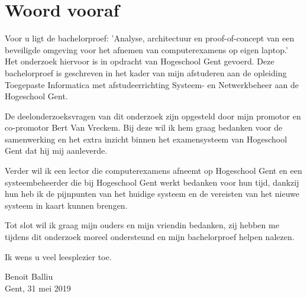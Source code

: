 
\chapter*{Woord vooraf}
\label{ch:voorwoord}


Voor u ligt de bachelorproef: 'Analyse, architectuur en proof-of-concept van een beveiligde omgeving voor het afnemen van computerexamens op eigen laptop.' Het onderzoek hiervoor is in opdracht van Hogeschool Gent gevoerd. Deze bachelorproef is geschreven in het kader van mijn afstuderen aan de opleiding Toegepaste Informatica met afstudeerrichting Systeem- en Netwerkbeheer aan de Hogeschool Gent.

De deelonderzoeksvragen van dit onderzoek zijn opgesteld door mijn promotor en co-promotor Bert Van Vreckem. Bij deze wil ik hem graag bedanken voor de samenwerking en het extra inzicht binnen het examensysteem van Hogeschool Gent dat hij mij aanleverde. 

Verder wil ik een lector die computerexamens afneemt op Hogeschool Gent en een systeembeheerder die bij Hogeschool Gent werkt bedanken voor hun tijd, dankzij hun heb ik de pijnpunten van het huidige systeem en de vereisten van het nieuwe systeem in kaart kunnen brengen.

Tot slot wil ik graag mijn ouders en mijn vriendin bedanken, zij hebben me tijdens dit onderzoek moreel ondersteund en mijn bachelorproef helpen nalezen.

Ik wens u veel leesplezier toe.

Benoit Balliu \\
Gent, 31 mei 2019 